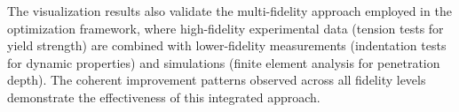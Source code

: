 The visualization results also validate the multi-fidelity approach employed in the optimization framework, where high-fidelity experimental data (tension tests for yield strength) are combined with lower-fidelity measurements (indentation tests for dynamic properties) and simulations (finite element analysis for penetration depth). The coherent improvement patterns observed across all fidelity levels demonstrate the effectiveness of this integrated approach.

